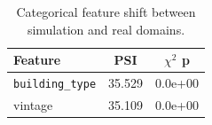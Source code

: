 \begin{table}[!ht]
\centering
\caption{Categorical feature shift between simulation and real domains.}
\label{tab:shift_categorical}
\begin{tabular}{l S S}
\toprule
Feature & {PSI} & {$\chi^2$ p} \\
\midrule
\texttt{building\_type} & 35.529 & 0.0e+00 \\
vintage & 35.109 & 0.0e+00 \\
\bottomrule
\end{tabular}
\end{table}
